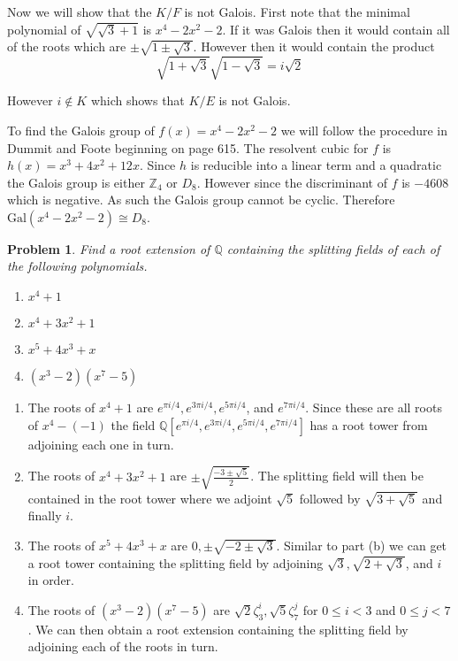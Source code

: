 \documentclass[10pt]{article}
\newcommand{\sk}{\vskip 10mm}
\newcommand{\bb}[1]{\mathbb{#1}}
\theoremstyle{plain}
\newtheorem{problem}{Problem}
\theoremstyle{remark}
\begin{document}
Now we will show that the $K/F$ is not Galois. First note that the
minimal polynomial of $\sqrt{\sqrt{3}+1}$ is $x^4-2x^2-2$. If it
was Galois then it would contain all of the roots which are
$\pm\sqrt{1\pm\sqrt{3}}$. However then it would contain the product
\[
  \sqrt{1+\sqrt{3}}\sqrt{1-\sqrt{3}}=i\sqrt{2}
\]

However $i\notin K$ which shows that $K/E$ is not Galois.

To find the Galois group of $f(x)=x^4-2x^2-2$ we will follow the procedure
in Dummit and Foote beginning on page 615. The resolvent cubic for
$f$ is $h(x)=x^3+4x^2+12x$. Since $h$ is reducible into a linear term
and a quadratic the Galois group is either $\bb{Z}_4$ or $D_8$. However
since the discriminant of $f$ is $-4608$ which is negative. As such
the Galois group cannot be cyclic. Therefore $\text{Gal}(x^4-2x^2-2)\cong D_8$.
\sk

\begin{problem}
  Find a root extension of $\bb{Q}$ containing the splitting fields
  of each of the following polynomials.
  \begin{enumerate}
  \item[(a)] $x^4+1$
  \item[(b)] $x^4+3x^2+1$
  \item[(c)] $x^5+4x^3+x$
  \item[(d)] $(x^3-2)(x^7-5)$
  \end{enumerate}
\end{problem}
\sk

\begin{enumerate}
\item [(a)] The roots of $x^4+1$ are $e^{\pi i/4},e^{3\pi i/4},e^{5\pi i/4}$, and $e^{7\pi i/4}$.
  Since these are all roots of $x^4-(-1)$ the field
  $\bb{Q}[e^{\pi i/4},e^{3\pi i/4},e^{5\pi i/4},e^{7\pi i/4}]$ has a root tower from adjoining
  each one in turn.
\item [(b)] The roots of $x^4+3x^2+1$ are $\pm\sqrt{\frac{-3\pm\sqrt{5}}{2}}$. The splitting
  field will then be contained in the root tower where we adjoint $\sqrt{5}$ followed
  by $\sqrt{3+\sqrt{5}}$ and finally $i$.
\item [(c)] The roots of $x^5+4x^3+x$ are $0,\pm\sqrt{-2\pm\sqrt{3}}$. Similar to part (b)
  we can get a root tower containing the splitting field by adjoining
  $\sqrt{3},\sqrt{2+\sqrt{3}}$, and $i$ in order.
\item [(d)] The roots of $(x^3-2)(x^7-5)$ are $\sqrt{2}\zeta_3^i,\sqrt{5}\zeta_7^j$ for $0\leq i<3$ and
  $0\leq j<7$. We can then obtain a root extension containing the splitting field by
  adjoining each of the roots in turn.
\end{enumerate}
\end{document}
